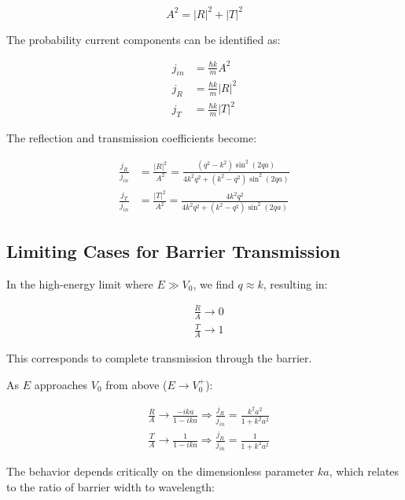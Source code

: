 \documentclass[italian]{HKNdocument}
\begin{document}
\begin{equation}
A^{2}=|R|^{2}+|T|^{2} \label{eq:6.63}
\end{equation}

The probability current components can be identified as:

\begin{align}
j_{i n} & =\frac{\hbar k}{m} A^{2} \\
j_{R} & =\frac{\hbar k}{m}|R|^{2}  \label{eq:6.64}\\
j_{T} & =\frac{\hbar k}{m}|T|^{2}
\end{align}

The reflection and transmission coefficients become:

\begin{align}
\frac{j_{R}}{j_{i n}} & =\frac{|R|^{2}}{A^{2}}=\frac{\left(q^{2}-k^{2}\right) \sin ^{2}(2 q a)}{4 k^{2} q^{2}+\left(k^{2}-q^{2}\right) \sin ^{2}(2 q a)} \\
\frac{j_{T}}{j_{i n}} & =\frac{|T|^{2}}{A^{2}}=\frac{4 k^{2} q^{2}}{4 k^{2} q^{2}+\left(k^{2}-q^{2}\right) \sin ^{2}(2 q a)} \label{eq:6.65}
\end{align}

\subsection{Limiting Cases for Barrier Transmission}

In the high-energy limit where $E \gg V_0$, we find $q \approx k$, resulting in:

\begin{align}
& \frac{R}{A} \rightarrow 0 \\
& \frac{T}{A} \rightarrow 1 \label{eq:6.66}
\end{align}

This corresponds to complete transmission through the barrier.

As $E$ approaches $V_0$ from above ($E \rightarrow V_0^+$):

\begin{align}
& \frac{R}{A} \rightarrow \frac{-i k a}{1-i k a} \Longrightarrow \frac{j_{R}}{j_{i n}}=\frac{k^{2} a^{2}}{1+k^{2} a^{2}}  \label{eq:6.67}\\
& \frac{T}{A} \rightarrow \frac{1}{1-i k a} \Longrightarrow \frac{j_{R}}{j_{i n}}=\frac{1}{1+k^{2} a^{2}}
\end{align}

The behavior depends critically on the dimensionless parameter $ka$, which relates to the ratio of barrier width to wavelength:
\end{document}
